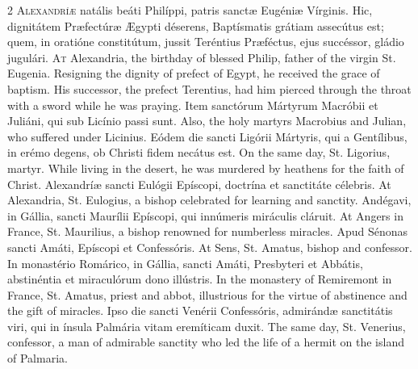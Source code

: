 \begin{paracol}{2}
\lettrine[lines=2]{A}{lexandríæ} natális 
 beáti Philíppi, patris sanctæ Eugéniæ Vírginis. Hic, dignitátem 
 Præfectúræ Ægypti déserens, Baptísmatis grátiam assecútus est; quem, in 
 oratióne constitútum, jussit Teréntius Præféctus, ejus succéssor, gládio 
 jugulári.
\switchcolumn
{}
\lettrine[lines=2]{A}{t} Alexandria, the birthday of 
 blessed Philip, father of the virgin St. Eugenia. Resigning the 
 dignity of prefect of Egypt, he received the grace of baptism. His 
 successor, the prefect Terentius, had him pierced through the throat with a 
 sword while he was praying.
\switchcolumn*
{}
Item sanctórum Mártyrum 
 Macróbii et Juliáni, qui sub Licínio passi sunt.
\switchcolumn
{}
Also, the holy martyrs Macrobius and 
 Julian, who suffered under Licinius.
\switchcolumn*
{}
Eódem die sancti 
 Ligórii Mártyris, qui a Gentílibus, in erémo degens, ob Christi fidem 
 necátus est.
\switchcolumn
{}
On the same day, St. Ligorius, 
 martyr. While living in the desert, he was murdered by heathens for 
 the faith of Christ.
\switchcolumn*
{}
Alexandríæ sancti 
 Eulógii Epíscopi, doctrína et sanctitáte célebris.
\switchcolumn
{}
At Alexandria, St. Eulogius, a 
 bishop celebrated for learning and sanctity.
\switchcolumn*
{}
Andégavi, in Gállia, 
 sancti Maurílii Epíscopi, qui innúmeris miráculis cláruit.
\switchcolumn
{}
At Angers in France, St. Maurilius, 
 a bishop renowned for numberless miracles.
\switchcolumn*
{}
Apud Sénonas sancti 
 Amáti, Epíscopi et Confessóris.
\switchcolumn
{}
At Sens, St. Amatus, bishop and 
 confessor.
\switchcolumn*
{}
In monastério Romárico, 
 in Gállia, sancti Amáti, Presbyteri et Abbátis, abstinéntia et miraculórum 
 dono illústris.
\switchcolumn
{}
In the monastery of Remiremont in 
 France, St. Amatus, priest and abbot, illustrious for the virtue of 
 abstinence and the gift of miracles.
\switchcolumn*
{}
Ipso die sancti Venérii 
 Confessóris, admirándæ sanctitátis viri, qui in ínsula Palmária vitam 
 eremíticam duxit.
\switchcolumn
{}
The same day, St. Venerius, 
 confessor, a man of admirable sanctity who led the life of a hermit on the 
 island of Palmaria.
\switchcolumn*
{}
\end{paracol}


